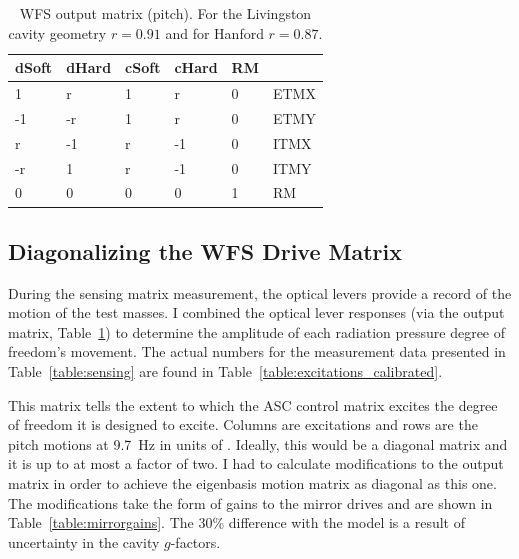 \begin{table}
\centering
\caption[WFS output matrix]{WFS output matrix (pitch). For the Livingston cavity geometry
  $r=0.91$ and for Hanford $r=0.87$.}
\begin{tabular}{l l l l l l}
\hline 
dSoft & dHard & cSoft & cHard & RM & \\
\hline 
1 & r & 1 & r & 0 & ETMX\\
-1 & -r & 1 & r & 0 & ETMY \\
r & -1 & r & -1 & 0 & ITMX\\
-r & 1 & r & -1 & 0 & ITMY\\
 0 & 0 & 0 & 0 & 1 & RM\\
\hline
\end{tabular}
\label{table:output}
\end{table}


\subsection{Diagonalizing the WFS Drive Matrix}

During the sensing matrix measurement, the optical levers provide a
record of the motion of the test masses. I combined the
optical lever responses (via the output matrix, Table~\ref{table:output})
to determine the amplitude of each radiation pressure degree of freedom's
movement. The actual numbers for the measurement data presented in
Table~\ref{table:sensing} are found in Table~\ref{table:excitations_calibrated}.

This matrix tells the extent to which the ASC control matrix excites
the degree of freedom it is designed to excite. Columns are
excitations and rows are the pitch motions at 9.7~Hz in units of
\microrad. Ideally, this would be a diagonal matrix and it is up to at
most a factor of two. I had to calculate modifications to the output
matrix in order to achieve the eigenbasis motion matrix as diagonal as
this one. The modifications take the form of gains to the mirror
drives and are shown in Table~\ref{table:mirrorgains}. The 30\%
difference with the model is a result of uncertainty in the cavity
$g$-factors.




